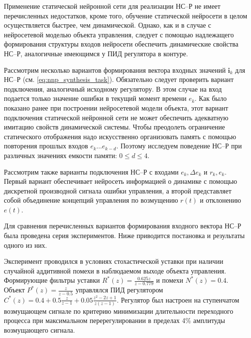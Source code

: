 Применение статической нейронной сети для реализации НС--Р не имеет
перечисленных недостатков, кроме того, обучение статической нейросети
в целом осуществляется быстрее, чем динамической.  Однако, как и в
случае с нейросетевой моделью объекта управления, следует с помощью
надлежащего формирования структуры входов нейросети обеспечить
динамические свойства НС--Р, аналогичные имеющимся у ПИД регулятора в
контуре. 

\label{nnc_inputs}%
Рассмотрим несколько вариантов формирования вектора входных значений
$\mathbf{i}_k$ для НС--Р (см. \eqref{eq:nnp_synthesis_task}).
Обязательно следует проверить вариант подключения, аналогичный
исходному регулятору.  В этом случае на вход подается только значение
ошибки в текущий момент времени $e_k$.  Как было показано ранее при
построении нейросетевой модели объекта, этот вариант подключения
статической нейронной сети не может обеспечить адекватную имитацию
свойств динамической системы.  Чтобы преодолеть ограничение
статического отображения надо искусственно организовать память с
помощью повторения прошлых входов $e_k\ldots e_{k-d}$.  Поэтому
исследуем поведение НС--Р при различных значениях емкости памяти:
$0\le d\le 4$.

Рассмотрим также варианты подключения НС--Р с входами $e_k,\Delta e_k$
и $r_k,e_k$.  Первый вариант обеспечивает нейросеть информацией о
динамике с помощью дискретной производной сигнала ошибки управления, а
второй представляет собой объединение концепций управления по
возмущению $r(t)$ и отклонению $e(t)$.

Для сравнения перечисленных вариантов формирования входного вектора
НС--Р была проведена серия экспериментов.  Ниже приводится постановка
и результаты одного из них.

Эксперимент проводился в условиях стохастической уставки при наличии
случайной аддитивной помехи в наблюдаемом выходе объекта управления.
Формирующие фильтры уставки $R^*(z)=\frac{0.625z}{z-0.779}$ и помехи
$N^*(z)=0.4$.  Объект $P^*(z)=\frac{z}{z-0.5}$ управлялся ПИД
регулятором $C^*(z)=0.4 + 0.5\frac{z}{z-1} +
0.05\frac{z^2-2z+1}{z(z-1)}$.  Регулятор был настроен на ступенчатом
возмущающем сигнале по критерию минимизации длительности переходного
процесса при максимальном перерегулировании в пределах 4\% амплитуды
возмущающего сигнала.


